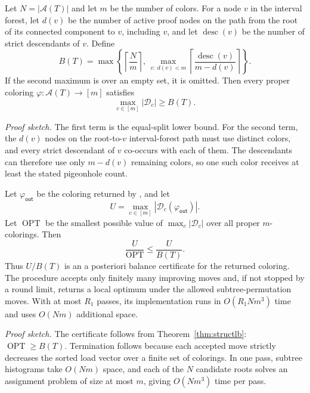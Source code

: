 \begin{theorem}
\label{thm:structlb}
Let $N=|\mathcal{A}(T)|$ and let $m$ be the number of colors. For a node $v$ in the interval forest, let $d(v)$ be the number of active proof nodes on the path from the root of its connected component to $v$, including $v$, and let $\operatorname{desc}(v)$ be the number of strict descendants of $v$. Define
\[
B(T)=
\max\left\{
\left\lceil \frac{N}{m}\right\rceil,\,
\max_{v:\ d(v)<m}
\left\lceil \frac{\operatorname{desc}(v)}{m-d(v)}\right\rceil
\right\}.
\]
If the second maximum is over an empty set, it is omitted.
Then every proper coloring $\varphi:\mathcal{A}(T)\rightarrow[m]$ satisfies
\[
\max_{c\in[m]} |\mathcal{D}_c| \ge B(T).
\]
\end{theorem}

\noindent\emph{Proof sketch.}
The first term is the equal-split lower bound. For the second term, the $d(v)$ nodes on the root-to-$v$ interval-forest path must use distinct colors, and every strict descendant of $v$ co-occurs with each of them. The descendants can therefore use only $m-d(v)$ remaining colors, so one such color receives at least the stated pigeonhole count.

\begin{proposition}
\label{prop:activebalancecert}
Let $\varphi_{\mathsf{out}}$ be the coloring returned by \ActiveBalance{}, and let
\[
U=\max_{c\in[m]}|\mathcal{D}_c(\varphi_{\mathsf{out}})|.
\]
Let $\operatorname{OPT}$ be the smallest possible value of $\max_c|\mathcal{D}_c|$ over all proper $m$-colorings. Then
\[
\frac{U}{\operatorname{OPT}}\le \frac{U}{B(T)}.
\]
Thus $U/B(T)$ is an a posteriori balance certificate for the returned coloring. The procedure accepts only finitely many improving moves and, if not stopped by a round limit, returns a local optimum under the allowed subtree-permutation moves. With at most $R_1$ passes, its implementation runs in $O(R_1Nm^3)$ time and uses $O(Nm)$ additional space.
\end{proposition}

\noindent\emph{Proof sketch.}
The certificate follows from Theorem~\ref{thm:structlb}: $\operatorname{OPT}\ge B(T)$. Termination follows because each accepted move strictly decreases the sorted load vector over a finite set of colorings. In one pass, subtree histograms take $O(Nm)$ space, and each of the $N$ candidate roots solves an assignment problem of size at most $m$, giving $O(Nm^3)$ time per pass.

